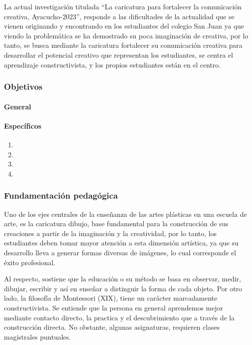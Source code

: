 \documentclass[12pt,a4paper]{article}
\begin{document}
La actual investigación titulada “La caricatura para fortalecer la comunicación creativa, Ayacucho-2023”, responde a las dificultades de la actualidad que se vienen originando y encontrando en los estudiantes del colegio San Juan ya que viendo la problemática se ha demostrado su  poca imaginación de creativa, por lo tanto, se busca mediante la caricatura fortalecer su comunicación creativa para desarrollar el potencial creativo que representan los estudiantes, se centra el aprendizaje constructivista, y los propios estudiantes están en el centro.

\subsubsection{Objetivos}

\paragraph{General}

\objetivo

\paragraph{Específicos}

\begin{enumerate}
\item \objetivoe
\item \objetivoee
\item \objetivoeee
\item \objetivoeeee
\end{enumerate}

\subsubsection{Fundamentación pedagógica}

Uno de los ejes centrales de la enseñanza de las artes plásticas en una escuela de arte, es la caricatura dibujo, base fundamental para la construcción de sus creaciones a partir de la imaginación y la creatividad, por lo tanto, los estudiantes deben tomar mayor atención a esta dimensión artística, ya que su desarrollo lleva a generar formas diversas de imágenes, lo cual corresponde el éxito profesional.

Al respecto, \cite{pestalozzi} sostiene que la educación o su método se basa en observar, medir, dibujar, escribir y así en enseñar a distinguir la forma de cada objeto.
Por otro lado, la filosofía de Montessori (XIX), tiene un carácter marcadamente constructivista. Se entiende que la persona en general aprendemos mejor mediante contacto directo, la practica y el descubrimiento que a través de la construcción directa. No obstante, algunas asignaturas, requieren clases magistrales puntuales.
\end{document}
